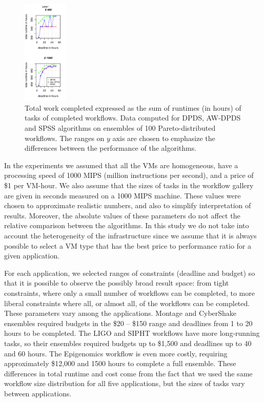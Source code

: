 \documentclass{sig-alternate}
\begin{document}
\begin{figure}[t]
\includegraphics[width=0.19\textwidth]{figures/pareto-size-SIPHT-n-1000-8-dagh5-50m0.pdf}
\caption{ Total work completed expressed as the sum of runtimes (in hours) of
tasks of completed workflows. Data computed for DPDS, AW-DPDS and SPSS
algorithms on ensembles of 100 Pareto-distributed workflows. The ranges on $y$ axis are chosen to 
emphasize the differences between the performance of the algorithms.}
\label{fig:total-time}
\end{figure}

In the experiments we assumed that all the VMs are homogeneous, have a
processing speed of 1000 MIPS (million instructions per second), and a price of
\$1 per VM-hour. We also assume that the sizes of tasks in the workflow gallery
are given in seconds measured on a 1000 MIPS machine. These values were chosen
to approximate realistic numbers, and also to simplify interpretation of
results. Moreover, the absolute values of these parameters do not affect the
relative comparison between the algorithms. In this study we do not take into
account the heterogeneity of the infrastructure since we assume that it is
always possible to select a VM type that has the best price to performance ratio
for a given application.


For each application, we selected ranges of constraints (deadline and budget) so
that it is possible to observe the possibly broad result space: from tight 
constraints, where only a small number of workflows can be completed, to 
more liberal constraints where all, or almost all, of the workflows can be 
completed. These parameters vary among the applications. Montage and CyberShake 
ensembles required budgets in the \$20 -- \$150 range and deadlines from 1 to
20 hours to be completed. The LIGO and SIPHT workflows have more long-running
tasks, so their ensembles required budgets up to \$1,500 and deadlines up to 
40 and 60 hours. The Epigenomics workflow is even more costly, requiring 
approximately \$12,000 and 1500 hours to complete a full ensemble. These
differences in total runtime and cost come from the fact that we used the
same workflow size distribution for all five applications, but
the sizes of tasks vary between applications.
\end{document}
